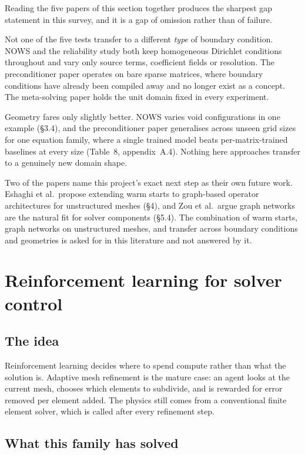 \documentclass[11pt, a4paper]{article}
\begin{document}
Reading the five papers of this section together produces the sharpest gap
statement in this survey, and it is a gap of omission rather than of failure.

Not one of the five tests transfer to a different \emph{type} of boundary
condition. NOWS and the reliability study both keep homogeneous Dirichlet
conditions throughout and vary only source terms, coefficient fields or
resolution. The preconditioner paper operates on bare sparse matrices, where
boundary conditions have already been compiled away and no longer exist as a
concept. The meta-solving paper holds the unit domain fixed in every
experiment.

Geometry fares only slightly better. NOWS varies void configurations in one
example (\S{}3.4), and the preconditioner paper generalises across unseen grid
sizes for one equation family, where a single trained model beats
per-matrix-trained baselines at every size (Table~8, appendix~A.4). Nothing
here approaches transfer to a genuinely new domain shape.

Two of the papers name this project's exact next step as their own future
work. Eshaghi et al.\ propose extending warm starts to graph-based operator
architectures for unstructured meshes (\S{}4), and Zou et al.\ argue graph
networks are the natural fit for solver components (\S{}5.4). The combination of
warm starts, graph networks on unstructured meshes, and transfer across
boundary conditions and geometries is asked for in this literature and not
answered by it.

\section{Reinforcement learning for solver control}
\label{sec:rl}

\subsection{The idea}

Reinforcement learning decides where to spend compute rather than what the
solution is. Adaptive mesh refinement is the mature case: an agent looks at
the current mesh, chooses which elements to subdivide, and is rewarded for
error removed per element added. The physics still comes from a conventional
finite element solver, which is called after every refinement step.

\subsection{What this family has solved}
\end{document}
